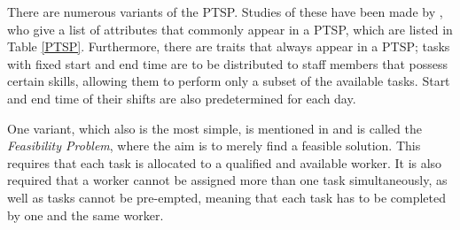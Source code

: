 There are numerous variants of the PTSP. Studies of these have been made by \citet{krishnamoorthy_2001}, who give a list of attributes that commonly appear in a PTSP, which are listed in Table \ref{PTSP}. Furthermore, there are traits that always appear in a PTSP; tasks with fixed start and end time are to be distributed to staff members that possess certain skills, allowing them to perform only a subset of the available tasks. Start and end time of their shifts are also predetermined for each day.

One variant, which also is the most simple, is mentioned in \citet{krishnamoorthy_2001} and is called the \textit{Feasibility Problem}, where the aim is to merely find a feasible solution. This requires that each task is allocated to a qualified and available worker. It is also required that a worker cannot be assigned more than one task simultaneously, as well as tasks cannot be pre-empted, meaning that each task has to be completed by one and the same worker.

